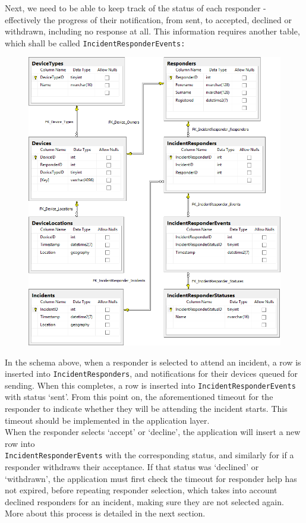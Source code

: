 \documentclass{article}
\begin{document}
Next, we need to be able to keep track of the status of each responder - effectively the progress of their notification, from sent, to accepted, declined or withdrawn, including no response at all. This information requires another table, which shall be called \texttt{\color{OliveGreen}IncidentResponderEvents:}\\	
	\begin{figure}[H]
		\centering
		\includegraphics[width=1\textwidth]{"Iteration2/cpr-database-2-portrait"}
	\end{figure}
	
	In the schema above, when a responder is selected to attend an incident, a row is inserted into \texttt{\color{OliveGreen}IncidentResponders}, and notifications for their devices queued for sending. When this completes, a row is inserted into \texttt{\color{OliveGreen}IncidentResponderEvents} with status ‘sent’. From this point on, the aforementioned timeout for the responder to indicate whether they will be attending the incident starts. This timeout should be implemented in the application layer.\\

When the responder selects ‘accept’ or ‘decline’, the application will insert a new row into\\
\texttt{\color{OliveGreen}IncidentResponderEvents} with the corresponding status, and similarly for if a responder withdraws their acceptance. If that status was ‘declined’ or ‘withdrawn’, the application must first check the timeout for responder help has not expired, before repeating responder selection, which takes into account declined responders for an incident, making sure they are not selected again. More about this process is detailed in the next section.\\
\end{document}
